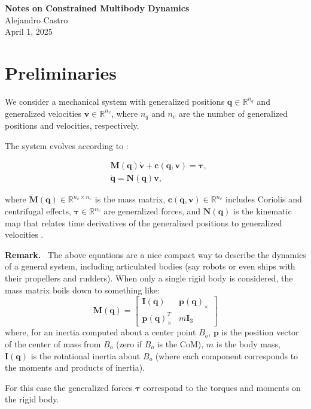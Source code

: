 \documentclass{article}
\newcommand{\vf}[1]{{\mf{#1}}}
\newcommand{\mf}[1]{{\mathbf{#1}}}
\newenvironment{remark}{\begin{remarkbox}\textbf{Remark.}~}{\end{remarkbox}}
\begin{document}
\begin{center}
    {\LARGE \textbf{Notes on Constrained Multibody Dynamics}}\\[0.5em]
    {\large Alejandro Castro}\\[0.5em]
    {\large April 1, 2025}
\end{center}

\section{Preliminaries}

We consider a mechanical system with generalized positions $\mf{q} \in
\mathbb{R}^{n_q}$ and generalized velocities $\mf{v} \in \mathbb{R}^{n_v}$,
where $n_q$ and $n_v$ are the number of generalized positions and velocities,
respectively.

The system evolves according to
\cite{bib:featherstone2008_rigid_body_dynamics_algorithms,bib:jain2010_robot_multibody_dynamics}:

\begin{eqnarray}
    &\mf{M}(\mf{q}) \dot{\mf{v}} + \mf{c}(\mf{q}, \mf{v}) = \bm{\tau},
    \label{eq:momentum_balance}\\    
    &\dot{\mf{q}} = \mf{N}(\mf{q})\mf{v},
    \label{eq:kinematic_map}
\end{eqnarray}

where $\mf{M}(\mf{q}) \in \mathbb{R}^{{n_v} \times {n_v}}$ is the mass matrix,
$\mf{c}(\mf{q}, \mf{v}) \in \mathbb{R}^{n_v}$ includes Coriolis and centrifugal
effects, $\bm{\tau} \in \mathbb{R}^{n_v}$ are generalized forces, and
$\mf{N}(\mf{q})$ is the kinematic map that relates time derivatives of the
generalized positions to generalized velocities \cite{bib:diebel2006}.

\begin{remark}
The above equations are a nice compact way to describe the dynamics of a general
system, including articulated bodies (say robots or even ships with their
propellers and rudders).
When only a single rigid body is considered, the mass matrix boils down to something like:
\begin{equation*}
    \mf{M}(\mf{q}) = \begin{bmatrix}
        \mf{I}(\mf{q}) & \vf{p}(\mf{q})_\times \\
        \vf{p}(\mf{q})_\times^T & m \mathbf{I}_3
        \end{bmatrix}
\end{equation*}
where, for an inertia computed about a center point $B_o$, $\vf{p}$ is the
position vector of the center of mass from $B_o$ (zero if $B_o$ is the CoM), $m$
is the body mass, $\mf{I}(\mf{q})$ is the rotational inertia about $B_o$ (where
each component corresponds to the moments and products of inertia).

For this case the generalized forces $\bm{\tau}$ correspond to the torques and
moments on the rigid body.
\end{remark}  
\end{document}
